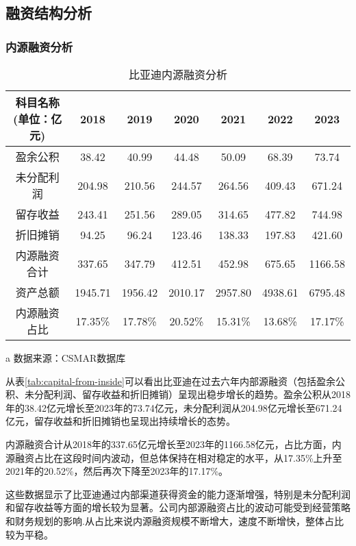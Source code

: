 \subsection{融资结构分析}
\subsubsection{内源融资分析}
\begin{table}
  \centering
  \begin{threeparttable}[c]
    \caption{比亚迪内源融资分析}
    \label{tab:capital-from-inside}
    \begin{tabular}{ccccccc}
      \toprule
        科目名称(单位：亿元) & 2018 & 2019 & 2020 & 2021 & 2022 & 2023 \\
      \midrule
        盈余公积 & 38.42  & 40.99  & 44.48  & 50.09  & 68.39  & 73.74  \\
        未分配利润 & 204.98  & 210.56  & 244.57  & 264.56  & 409.43  & 671.24  \\
        留存收益 & 243.41  & 251.56  & 289.05  & 314.65  & 477.82  & 744.98  \\
        折旧摊销 & 94.25  & 96.24  & 123.46  & 138.33  & 197.83  & 421.60  \\
        内源融资合计 & 337.65  & 347.79  & 412.51  & 452.98  & 675.65  & 1166.58  \\
        资产总额 & 1945.71  & 1956.42  & 2010.17  & 2957.80  & 4938.61  & 6795.48  \\
        内源融资占比 & 17.35\% & 17.78\% & 20.52\% & 15.31\% & 13.68\% & 17.17\% \\
      \bottomrule
    \end{tabular}
    \begin{tablenotes}
      \item [a] 数据来源：CSMAR数据库
    \end{tablenotes}
  \end{threeparttable}
\end{table}
从表\eqref{tab:capital-from-inside}可以看出比亚迪在过去六年内部源融资（包括盈余公积、未分配利润、留存收益和折旧摊销）呈现出稳步增长的趋势。盈余公积从2018年的38.42亿元增长至2023年的73.74亿元，未分配利润从204.98亿元增长至671.24亿元，留存收益和折旧摊销也呈现出持续增长的态势。

内源融资合计从2018年的337.65亿元增长至2023年的1166.58亿元，占比方面，内源融资占比在这段时间内波动，但总体保持在相对稳定的水平，从17.35\%上升至2021年的20.52\%，然后再次下降至2023年的17.17\%。

这些数据显示了比亚迪通过内部渠道获得资金的能力逐渐增强，特别是未分配利润和留存收益等方面的增长较为显著。公司内部源融资占比的波动可能受到经营策略和财务规划的影响.从占比来说内源融资规模不断增大，速度不断增快，整体占比较为平稳。
